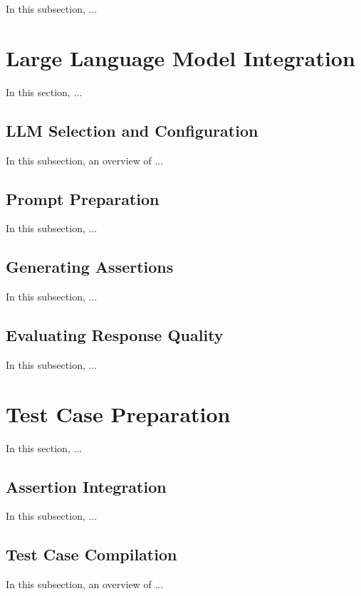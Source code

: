 In this subsection, ...

\section{Large Language Model Integration}
\label{sec:llm_integration}
\vspace{0.2 cm}

In this section, ...

\vspace{0.1 cm}
\subsection{LLM Selection and Configuration}
\label{sec:llm_configurations}
\vspace{0.1 cm}

In this subsection, an overview of ...

\vspace{0.1 cm}
\subsection{Prompt Preparation}
\label{sec:prompt_preparation}
\vspace{0.1 cm}

In this subsection, ...

\vspace{0.1 cm}
\subsection{Generating Assertions}
\label{sec:generating_assertions}
\vspace{0.1 cm}

In this subsection, ...

\vspace{0.1 cm}
\subsection{Evaluating Response Quality}
\label{sec:evaluating_response}
\vspace{0.1 cm}

In this subsection, ...

\section{Test Case Preparation}
\label{sec:test_case_preparation}
\vspace{0.2 cm}

In this section, ...

\vspace{0.1 cm}
\subsection{Assertion Integration}
\label{sec:assertion_integration}
\vspace{0.1 cm}

In this subsection, ...

\vspace{0.1 cm}
\subsection{Test Case Compilation}
\label{sec:test_compilation}
\vspace{0.1 cm}

In this subsection, an overview of ...